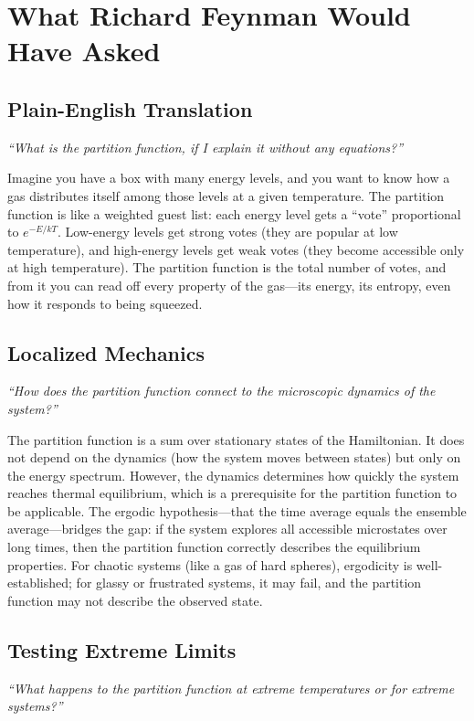 \section*{What Richard Feynman Would Have Asked}

\subsection*{Plain-English Translation}
\textit{``What is the partition function, if I explain it without any equations?''}

Imagine you have a box with many energy levels, and you want to know how a gas distributes itself among those levels at a given temperature. The partition function is like a weighted guest list: each energy level gets a ``vote'' proportional to $e^{-E/kT}$. Low-energy levels get strong votes (they are popular at low temperature), and high-energy levels get weak votes (they become accessible only at high temperature). The partition function is the total number of votes, and from it you can read off every property of the gas---its energy, its entropy, even how it responds to being squeezed.

\subsection*{Localized Mechanics}
\textit{``How does the partition function connect to the microscopic dynamics of the system?''}

The partition function is a sum over stationary states of the Hamiltonian. It does not depend on the dynamics (how the system moves between states) but only on the energy spectrum. However, the dynamics determines how quickly the system reaches thermal equilibrium, which is a prerequisite for the partition function to be applicable. The ergodic hypothesis---that the time average equals the ensemble average---bridges the gap: if the system explores all accessible microstates over long times, then the partition function correctly describes the equilibrium properties. For chaotic systems (like a gas of hard spheres), ergodicity is well-established; for glassy or frustrated systems, it may fail, and the partition function may not describe the observed state.

\subsection*{Testing Extreme Limits}
\textit{``What happens to the partition function at extreme temperatures or for extreme systems?''}

